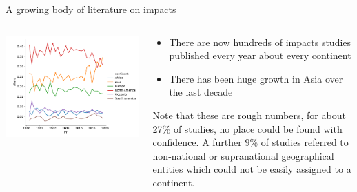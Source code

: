 \documentclass[9pt]{beamer}
\begin{document}
\begin{frame}{A growing body of literature on impacts}
\begin{columns}
\begin{column}{0.382\linewidth}
		\includegraphics[width=\linewidth]{../plots/literature_distribution/PY_continent_shares.pdf}
	\end{column}
	\begin{column}{0.618\linewidth}
		\begin{itemize}
			\item There are now hundreds of impacts studies published every year about every continent
			\item There has been huge growth in Asia over the last decade			
		\end{itemize}
	
	\medskip Note that these are rough numbers, for about 27\% of studies, no place could be found with confidence. A further 9\% of studies referred to non-national or supranational geographical entities which could not be easily assigned to a continent.
	\end{column}
\end{columns}

\end{frame}
\end{document}
